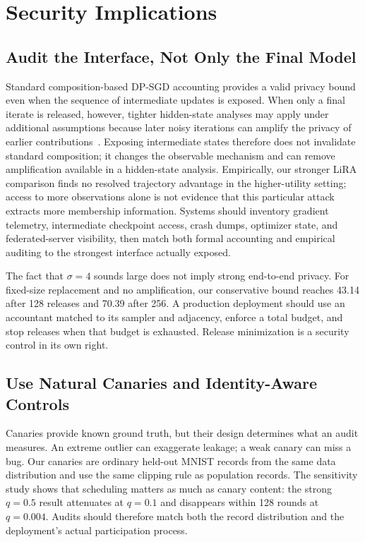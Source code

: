 \documentclass[conference]{IEEEtran}
\begin{document}
\section{Security Implications}

\subsection{Audit the Interface, Not Only the Final Model}

Standard composition-based DP-SGD accounting provides a valid privacy bound even when the sequence of intermediate updates is exposed. When only a final iterate is released, however, tighter hidden-state analyses may apply under additional assumptions because later noisy iterations can amplify the privacy of earlier contributions~\cite{feldman2018iteration,ye2022hidden}. Exposing intermediate states therefore does not invalidate standard composition; it changes the observable mechanism and can remove amplification available in a hidden-state analysis. Empirically, our stronger LiRA comparison finds no resolved trajectory advantage in the higher-utility setting; access to more observations alone is not evidence that this particular attack extracts more membership information. Systems should inventory gradient telemetry, intermediate checkpoint access, crash dumps, optimizer state, and federated-server visibility, then match both formal accounting and empirical auditing to the strongest interface actually exposed.

The fact that $\sigma=4$ sounds large does not imply strong end-to-end privacy. For fixed-size replacement and no amplification, our conservative bound reaches 43.14 after 128 releases and 70.39 after 256. A production deployment should use an accountant matched to its sampler and adjacency, enforce a total budget, and stop releases when that budget is exhausted. Release minimization is a security control in its own right.

\subsection{Use Natural Canaries and Identity-Aware Controls}

Canaries provide known ground truth, but their design determines what an audit measures. An extreme outlier can exaggerate leakage; a weak canary can miss a bug. Our canaries are ordinary held-out MNIST records from the same data distribution and use the same clipping rule as population records. The sensitivity study shows that scheduling matters as much as canary content: the strong $q=0.5$ result attenuates at $q=0.1$ and disappears within 128 rounds at $q=0.004$. Audits should therefore match both the record distribution and the deployment's actual participation process.
\end{document}
